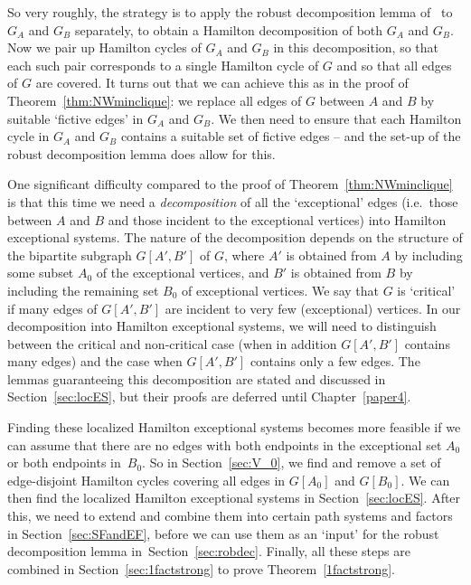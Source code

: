 \documentclass{memo-l}
\numberwithin{section}{chapter}
\numberwithin{equation}{section}
\numberwithin{firstthm}{section}
\numberwithin{figure}{section}
\begin{document}
So very roughly, the strategy is to apply the robust decomposition lemma of~\cite{Kelly} to $G_A$ and $G_B$ separately, 
to obtain a Hamilton decomposition of both $G_A$ and $G_B$.
Now we pair up Hamilton cycles of $G_A$ and $G_B$ in this decomposition, so that each such pair corresponds to a single 
Hamilton cycle of $G$ and so that all edges of $G$ are covered.
It turns out that we can achieve this as in the proof of Theorem~\ref{thm:NWminclique}:
we replace all edges of $G$ between $A$ and $B$  by suitable `fictive edges' in $G_A$ and $G_B$.
We then need to ensure that each Hamilton cycle in $G_A$ and $G_B$ contains a suitable set of fictive edges
-- and the set-up of the robust decomposition lemma does allow for this.

One significant difficulty compared to the proof of Theorem~\ref{thm:NWminclique}
is that this time we need a \emph{decomposition} of all the `exceptional' edges
(i.e.~those between $A$ and $B$ and those incident to the exceptional vertices)
into Hamilton exceptional systems. 
The nature of the decomposition depends on the structure of the bipartite subgraph $G[A',B']$ of $G$,
where $A'$ is obtained from $A$ by including some subset $A_0$ of the exceptional vertices, and $B'$ is obtained
from $B$ by including the remaining set $B_0$ of exceptional vertices.
We say that $G$ is `critical' if many edges of $G[A',B']$ are incident 
to very few (exceptional) vertices. In our decomposition into Hamilton exceptional systems,
we will need to distinguish between the critical and non-critical case (when in addition $G[A',B']$ contains many edges)
and the case when $G[A',B']$ contains
only a few edges. The lemmas guaranteeing this decomposition are stated and discussed in Section~\ref{sec:locES},
but their proofs are deferred until Chapter~\ref{paper4}.

Finding these localized Hamilton exceptional systems becomes more feasible if we can assume that 
there are no edges with both endpoints in the exceptional set $A_0$ or both endpoints in~$B_0$.
So in Section~\ref{sec:V_0}, we find and remove a set of edge-disjoint Hamilton cycles covering all edges in $G[A_0]$ and $G[B_0]$.
We can then find the localized Hamilton exceptional systems in Section~\ref{sec:locES}. After this, we need to extend and combine them into 
certain path systems and factors in Section~\ref{sec:SFandEF}, before we can use them as an `input' for the robust decomposition lemma in~Section~\ref{sec:robdec}.
Finally, all these steps are combined in Section~\ref{sec:1factstrong} to prove Theorem~\ref{1factstrong}.
\end{document}
